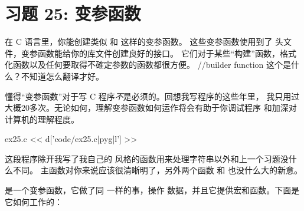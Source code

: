\chapter{习题 25: 变参函数}

在 C 语言里，你能创建类似  和  这样的变参函数。
这些变参函数使用到了  头文件，变参函数能给你的库文件创建良好的接口。
它们对于某些“构建”函数，格式化函数以及任何要取得不確定参数的函数都很方便。
//builder function 这个是什么？不知道怎么翻译才好。 

懂得“变参函数”对于写 C 程序\emph{不}是必须的。回想我写程序的这些年里，
我只用过大概20多次。无论如何，理解变参函数如何运作将会有助于你调试程序
和加深对计算机的理解程度。

\begin{code}{ex25.c}
<< d['code/ex25.c|pyg|l'] >>
\end{code}

这段程序除开我写了我自己的  风格的函数用来处理字符串以外和上一个习题没什么不同。
主函数对你来说应该很清晰明了，另外两个函数  和  
也没什么大的新意。

 是一个变参函数，它做了同  一样的事，操作 
数据，并且它提供宏和函数。下面是它如何工作的：

